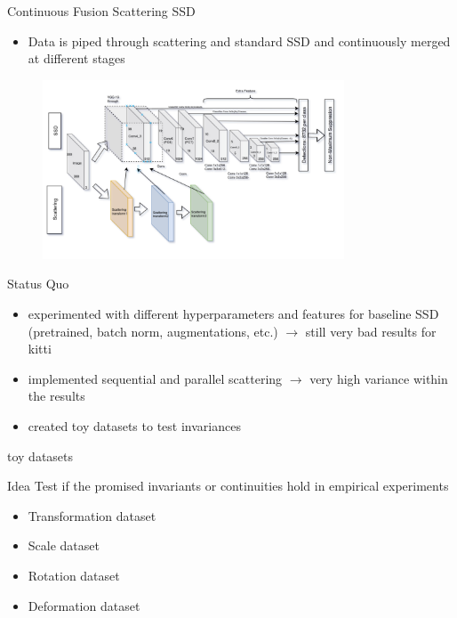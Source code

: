 \documentclass[compress]{beamer}
\begin{document}
	\begin{frame}{Continuous Fusion Scattering SSD}
		\begin{block}{}
			\begin{itemize}
				\item Data is piped through scattering and standard SSD and continuously merged at different stages
			\end{itemize}
		\end{block}
		\begin{figure}
			\centering
			\includegraphics[width=0.8\textwidth]{images/parallel_scattering_ssd.png}
		\end{figure}
	\end{frame}
	\begin{frame}{Status Quo}
		\begin{itemize}
			\item experimented with different hyperparameters and features for baseline SSD (pretrained, batch norm, augmentations, etc.) $\rightarrow$ still very bad results for kitti
			\item implemented sequential and parallel scattering $\rightarrow$ very high variance within the results
			\item created toy datasets to test invariances
		\end{itemize}
	\end{frame}
	\begin{frame}{toy datasets}
		\begin{block}{Idea}
			Test if the promised invariants or continuities hold in empirical experiments
		\end{block}
		\begin{itemize}
			\item Transformation dataset
			\item Scale dataset
			\item Rotation dataset
			\item Deformation dataset
		\end{itemize}
	\end{frame}
\end{document}
